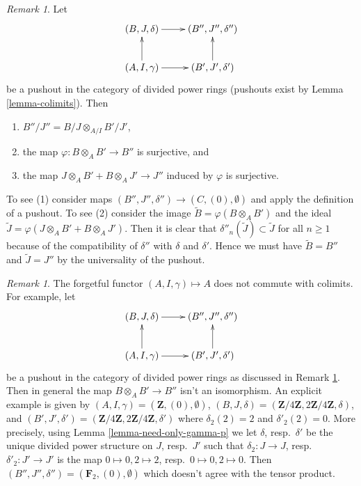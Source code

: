 \documentclass{stacks-project}
\theoremstyle{plain}
\theoremstyle{definition}
\theoremstyle{remark}
\newtheorem{remark}[subsection]{Remark}
\numberwithin{equation}{subsection}
\begin{document}
\begin{remark}
\label{remark-pushout}
Let
$$
\xymatrix{
(B, J, \delta) \ar[r] & (B'', J'', \delta'') \\
(A, I, \gamma) \ar[r] \ar[u] & (B', J', \delta') \ar[u]
}
$$
be a pushout in the category of divided power rings (pushouts exist
by Lemma \ref{lemma-colimits}). Then
\begin{enumerate}
\item $B''/J'' = B/J \otimes_{A/I} B'/J'$,
\item the map $\varphi : B \otimes_A B' \to B''$ is surjective, and
\item the map $J \otimes_A B' + B \otimes_A J' \to J''$ induced by $\varphi$
is surjective.
\end{enumerate}
To see (1) consider maps $(B'', J'', \delta'') \to (C, (0), \emptyset)$
and apply the definition of a pushout. To see (2) consider the
image $\tilde B = \varphi(B \otimes_A B')$ and the ideal
$\tilde J = \varphi(J \otimes_A B' + B \otimes_A J')$. Then it is
clear that $\delta''_n(\tilde J) \subset \tilde J$ for all $n \geq 1$
because of the compatibility of $\delta''$ with $\delta$ and $\delta'$.
Hence we must have $\tilde B = B''$ and $\tilde J = J''$ by the universality
of the pushout.
\end{remark}

\begin{remark}
\label{remark-forgetful}
The forgetful functor $(A, I, \gamma) \mapsto A$ does not commute with
colimits. For example, let
$$
\xymatrix{
(B, J, \delta) \ar[r] & (B'', J'', \delta'') \\
(A, I, \gamma) \ar[r] \ar[u] & (B', J', \delta') \ar[u]
}
$$
be a pushout in the category of divided power rings as discussed
in Remark \ref{remark-pushout}. Then in general the map
$B \otimes_A B' \to B''$ isn't an isomorphism.
An explicit example is given by
$(A, I, \gamma) = (\mathbf{Z}, (0), \emptyset)$,
$(B, J, \delta) = (\mathbf{Z}/4\mathbf{Z}, 2\mathbf{Z}/4\mathbf{Z}, \delta)$,
and
$(B', J', \delta') =
(\mathbf{Z}/4\mathbf{Z}, 2\mathbf{Z}/4\mathbf{Z}, \delta')$
where $\delta_2(2) = 2$ and $\delta'_2(2) = 0$.
More precisely, using Lemma \ref{lemma-need-only-gamma-p}
we let $\delta$, resp.\ $\delta'$ be the unique
divided power structure on $J$, resp.\ $J'$ such that
$\delta_2 : J \to J$, resp.\ $\delta'_2 : J' \to J'$
is the map $0 \mapsto 0, 2 \mapsto 2$, resp.\ $0 \mapsto 0, 2 \mapsto 0$.
Then $(B'', J'', \delta'') = (\mathbf{F}_2, (0), \emptyset)$
which doesn't agree with the tensor product.
\end{remark}
\end{document}
